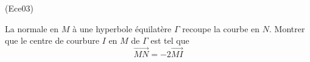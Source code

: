 \begin{tiny}(Ece03)\end{tiny}
La normale en $M$ {\`a} une hyperbole {\'e}quilat{\`e}re $\Gamma $
recoupe la courbe en $N$. Montrer que le centre de courbure $I$ en $M$ de $\Gamma $ est tel que
\begin{displaymath}
 \overrightarrow{MN}=-2\overrightarrow{MI}
\end{displaymath}
